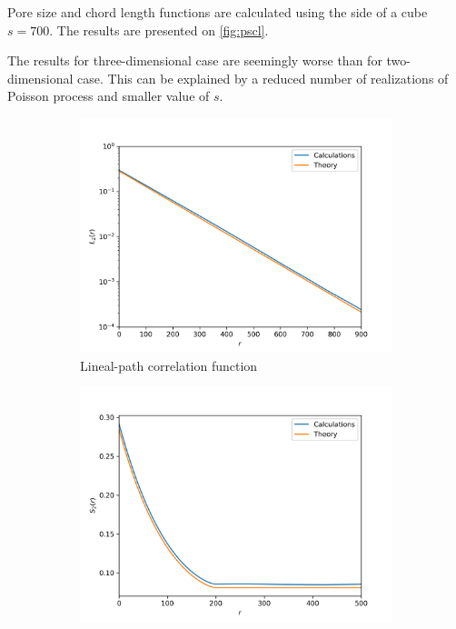 \documentclass[reprint,amsmath,amssymb,aps,pre]{revtex4-1}
\begin{document}
Pore size and chord length functions are calculated using the side of a cube
$s = 700$. The results are presented on \cref{fig:pscl}.

The results for three-dimensional case are seemingly worse than for
two-dimensional case. This can be explained by a reduced number of realizations
of Poisson process and smaller value of $s$.

\onecolumngrid
\begin{figure}[t]
  \centering
  \begin{subfigure}[b]{0.475\textwidth}
    \centering
    \includegraphics[width=\textwidth]{images/l2-2d.png}
    \caption[]{{\small Lineal-path correlation function}}
    \label{fig:l2-2d}
  \end{subfigure}
  \hfill
  \begin{subfigure}[b]{0.475\textwidth}
    \centering
    \includegraphics[width=\textwidth]{images/s2-2d.png}

\end{subfigure}
\end{figure}
\end{document}
